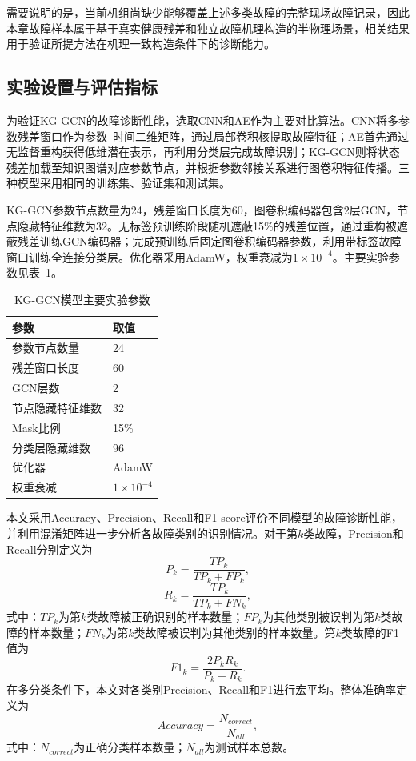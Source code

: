 需要说明的是，当前机组尚缺少能够覆盖上述多类故障的完整现场故障记录，因此本章故障样本属于基于真实健康残差和独立故障机理构造的半物理场景，相关结果用于验证所提方法在机理一致构造条件下的诊断能力。

\subsection{实验设置与评估指标}
\label{subsec:experiment_setting_v6}

为验证KG-GCN的故障诊断性能，选取CNN和AE作为主要对比算法。CNN将多参数残差窗口作为参数--时间二维矩阵，通过局部卷积核提取故障特征；AE首先通过无监督重构获得低维潜在表示，再利用分类层完成故障识别；KG-GCN则将状态残差加载至知识图谱对应参数节点，并根据参数邻接关系进行图卷积特征传播。三种模型采用相同的训练集、验证集和测试集。

KG-GCN参数节点数量为24，残差窗口长度为60，图卷积编码器包含2层GCN，节点隐藏特征维数为32。无标签预训练阶段随机遮蔽15\%的残差位置，通过重构被遮蔽残差训练GCN编码器；完成预训练后固定图卷积编码器参数，利用带标签故障窗口训练全连接分类层。优化器采用AdamW，权重衰减为$1\times10^{-4}$。主要实验参数见表~\ref{tab:kg_setting_v6}。

\begin{table}[htbp]
    \centering
    \caption{KG-GCN模型主要实验参数}
    \label{tab:kg_setting_v6}
    \begin{tabular}{ll}
        \toprule
        参数 & 取值 \\
        \midrule
        参数节点数量 & 24 \\
        残差窗口长度 & 60 \\
        GCN层数 & 2 \\
        节点隐藏特征维数 & 32 \\
        Mask比例 & 15\% \\
        分类层隐藏维数 & 96 \\
        优化器 & AdamW \\
        权重衰减 & $1\times10^{-4}$ \\
        \bottomrule
    \end{tabular}
\end{table}

本文采用Accuracy、Precision、Recall和F1-score评价不同模型的故障诊断性能，并利用混淆矩阵进一步分析各故障类别的识别情况。对于第$k$类故障，Precision和Recall分别定义为
\begin{equation}
P_k=\frac{TP_k}{TP_k+FP_k},
\end{equation}
\begin{equation}
R_k=\frac{TP_k}{TP_k+FN_k},
\end{equation}
式中：$TP_k$为第$k$类故障被正确识别的样本数量；$FP_k$为其他类别被误判为第$k$类故障的样本数量；$FN_k$为第$k$类故障被误判为其他类别的样本数量。第$k$类故障的F1值为
\begin{equation}
F1_k=\frac{2P_kR_k}{P_k+R_k}.
\end{equation}
在多分类条件下，本文对各类别Precision、Recall和F1进行宏平均。整体准确率定义为
\begin{equation}
Accuracy=\frac{N_{correct}}{N_{all}},
\end{equation}
式中：$N_{correct}$为正确分类样本数量；$N_{all}$为测试样本总数。

